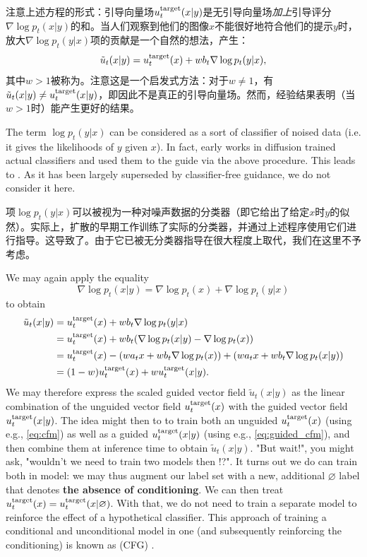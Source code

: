 注意上述方程的形式：引导向量场$u^{\text{target}}_t(x|y)$是无引导向量场\emph{加上}引导评分$\nabla\log p_t(x|y)$的和。当人们观察到他们的图像$x$不能很好地符合他们的提示$y$时，放大$\nabla \log p_t(y|x)$项的贡献是一个自然的想法，产生：
\begin{align*}
    \tilde{u}_t(x|y) = u^{\text{target}}_t(x) + w b_t \nabla \log p_t(y|x),
\end{align*}
其中$w > 1$被称为。注意这是一个启发式方法：对于$w \neq 1$，有$\tilde{u}_t(x|y) \neq u^{\text{target}}_t(x|y)$，即因此不是真正的引导向量场。然而，经验结果表明（当$w > 1$时）能产生更好的结果。 
\begin{remarkbox}
The term $\log p_t(y|x)$ can be considered as a sort of classifier of noised data (i.e. it gives the likelihoods of $y$ given $x$). In fact, early works in diffusion trained actual classifiers and used them to the guide via the above procedure. This leads to  \cite{classifier_guidance, yangsong_sde}. As it has been largely superseded by classifier-free guidance, we do not consider it here. 
\end{remarkbox}
\begin{remarkbox}[分类器在哪里？]
项$\log p_t(y|x)$可以被视为一种对噪声数据的分类器（即它给出了给定$x$时$y$的似然）。实际上，扩散的早期工作训练了实际的分类器，并通过上述程序使用它们进行指导。这导致了\cite{classifier_guidance, yangsong_sde}。由于它已被无分类器指导在很大程度上取代，我们在这里不予考虑。
\end{remarkbox}

We may again apply the equality $$\nabla \log p_t(x|y) = \nabla \log p_t(x) + \nabla \log p_t(y|x)$$ to obtain 
\begin{align*}\tilde{u}_t(x|y) &= u^{\text{target}}_t(x) + w b_t \nabla \log p_t(y|x)\\
&= u^{\text{target}}_t(x) + w b_t (\nabla \log p_t(x|y) - \nabla \log p_t(x))\\
&= u^{\text{target}}_t(x) - (w a_tx + w b_t \nabla \log p_t(x)) + (w a_t x + w b_t \nabla \log p_t(x|y))\\
&= (1-w) u^{\text{target}}_t(x) + w u^{\text{target}}_t(x|y).\end{align*}
We may therefore express the scaled guided vector field $\tilde{u}_t(x|y)$ as the linear combination of the unguided vector field $u^{\text{target}}_t(x)$ with the guided vector field $u^{\text{target}}_t(x|y)$. The idea might then to to train both an unguided $u^{\text{target}}_t(x)$ (using e.g., \cref{eq:cfm}) as well as a guided $u^{\text{target}}_t(x|y)$ (using e.g., \cref{eq:guided_cfm}), and then combine them at inference time to obtain $\tilde{u}_t(x|y)$. "But wait!", you might ask, "wouldn't we need to train two models then !?". It turns out we do can train both in model: we may thus augment our label set with a new, additional $\varnothing$ label that denotes \textbf{the absence of conditioning}. We can then treat $u^{\text{target}}_t(x)=u^{\text{target}}_t(x|\varnothing)$. With that, we do not need to train a separate model to reinforce the effect of a hypothetical classifier. This approach of training a conditional and unconditional model in one (and subsequently reinforcing the conditioning) is known as  (CFG) \cite{cfg}.

